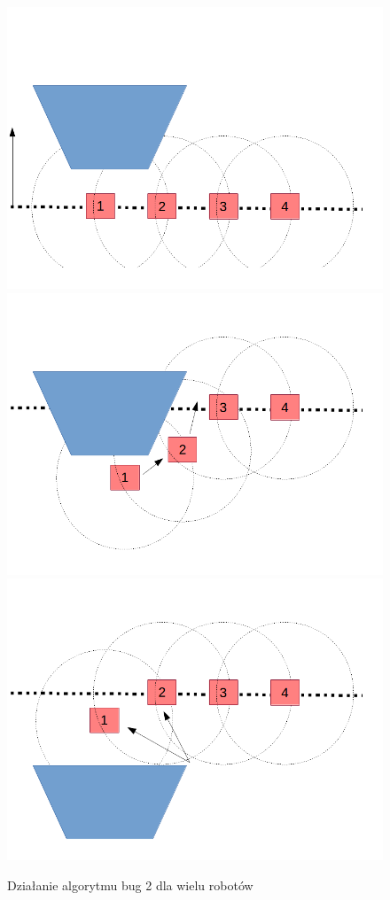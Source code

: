 \documentclass[a4paper, 12pt]{article}
\begin{document}
	\begin{figure}[h!]
		\includegraphics*[width=0.5\columnwidth]{img/przeszkoda/1.png}
		\includegraphics*[width=0.5\columnwidth]{img/przeszkoda/2.png}
		\includegraphics*[width=0.5\columnwidth]{img/przeszkoda/3.png}
		\caption{Działanie algorytmu bug 2 dla wielu robotów}
		\label{omijanie}
	\end{figure}
\end{document}
